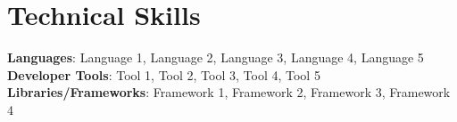 \documentclass[letterpaper,11pt]{article}
\begin{document}
\section{Technical Skills}
 \begin{itemize}[leftmargin=0.15in, label={}]
    \small{\item{
     \textbf{Languages}{: Language 1, Language 2, Language 3, Language 4, Language 5} \\[1mm]
     \textbf{Developer Tools}{: Tool 1, Tool 2, Tool 3, Tool 4, Tool 5} \\[1mm]
     \textbf{Libraries/Frameworks}{: Framework 1, Framework 2, Framework 3, Framework 4} \\ [1mm]
    }}
 \end{itemize}
 \vspace{-16pt}
 \vspace{3pt}
\vspace{10pt}

\vspace{-15pt}
\end{document}
